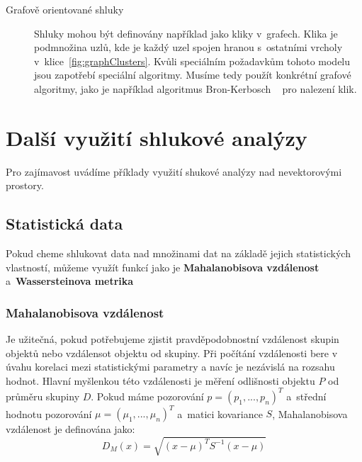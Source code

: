 \begin{description}
\item[Grafově orientované shluky] Shluky mohou být definovány například jako kli\-ky v~grafech. Klika je podmnožina uzlů, kde je každý uzel spojen hranou s~ostatními vrcholy v~klice~\autoref{fig:graphClusters}.
Kvůli speciálním požadavkům tohoto modelu jsou zapotřebí speciální algoritmy. Musíme tedy použít konkrétní grafové algoritmy, jako je například algoritmus Bron-Kerbosch ~\cite{Sun15} pro nalezení klik.
\end{description}

\section{Další využití shlukové analýzy} \label{sec:otherdata}
Pro zajímavost uvádíme příklady využití shukové analýzy nad nevektorovými prostory.

\subsection{Statistická data}
Pokud cheme shlukovat data nad množinami dat na základě jejich statistických vlastností, můžeme využít funkcí jako je \textbf{Mahalanobisova vzdálenost} a~\textbf{Wassersteinova metrika}

\subsubsection{Mahalanobisova vzdálenost}
Je užitečná, pokud potřebujeme zjistit pravděpodobnostní vzdálenost skupin objektů nebo vzdálensot objektu od skupiny. Při počítání vzdálenosti bere v úvahu korelaci mezi statistickými parametry a navíc je nezávislá na rozsahu hodnot. Hlavní myšlenkou této vzdálenosti je měření odlišnosti objektu $P$ od průměru skupiny $D$.
Pokud máme pozorování $p = (p_1,..., p_n)^T$ a~střední hodnotu pozorování $\mu=(\mu_1,...,\mu_n)^T $ a~matici kovariance $S$, Mahalanobisova vzdálenost je definována jako:
$$D_M(x) = \sqrt{(x - \mu)^T S^{-1} (x-\mu)}$$

